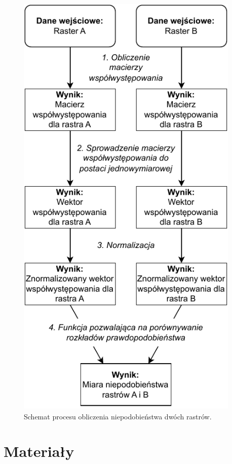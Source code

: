 \documentclass{amuthesis}
\begin{document}
\begin{figure}[t]

{\centering \includegraphics[width=4.19792in,height=8.33333in]{figures/diagram_raster_comparison.pdf}

}

\caption{\label{fig-schemat-porownanie}Schemat procesu obliczenia
niepodobieństwa dwóch rastrów.}

\end{figure}


\hypertarget{sec-materialy}{%
\chapter{Materiały}\label{sec-materialy}}
\end{document}
